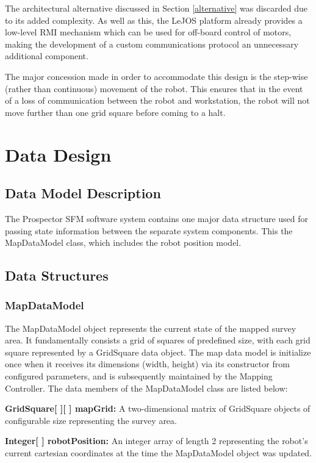 \documentclass[12pt]{article}
\begin{document}
The architectural alternative discussed in Section \ref{alternative} was discarded due to its added complexity. As well as this, the LeJOS platform already provides a low-level RMI mechanism which can be used for off-board control of motors, making the development of a custom communications protocol an unnecessary additional component. 

The major concession made in order to accommodate this design is the step-wise (rather than continuous) movement of the robot. This ensures that in the event of a loss of communication between the robot and workstation, the robot will not move further than one grid square before coming to a halt.

\section {Data Design}\label{Data}

\subsection{Data Model Description}
The Prospector SFM software system contains one major data structure used for passing  state information between the separate system components. This the MapDataModel class, which includes the robot position model. 

\subsection{Data Structures}

\subsubsection{MapDataModel}
The MapDataModel object represents the current state of the mapped survey area. It fundamentally consists a grid of squares of predefined size, with each grid square represented by a GridSquare data object. The map data model is initialize once when it receives its dimensions (width, height) via its constructor from configured parameters, and is subsequently maintained by the Mapping Controller. The data members of the MapDataModel class are listed below:

\begin{description}
\item{\textbf{GridSquare[ ][ ] mapGrid: }} A two-dimensional matrix of GridSquare objects of configurable size representing the survey area.
\item{\textbf{Integer[ ] robotPosition: }} An integer array of length 2 representing the robot's current cartesian coordinates at the time the MapDataModel object was updated.
\end{description}
\end{document}
